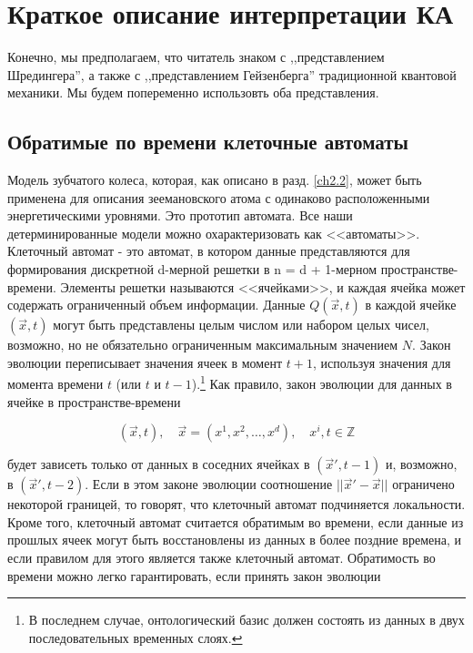 \documentclass[main.tex]{subfiles}
\begin{document}
\section{Краткое описание интерпретации КА}\label{ch5}

Конечно, мы предполагаем, что читатель знаком с ,,представлением Шредингера'', а также с ,,представлением Гейзенберга'' традиционной квантовой механики. Мы будем попеременно использовть оба представления.

\subsection{Обратимые по времени клеточные автоматы }\label{ch5.1}

Модель зубчатого колеса, которая, как описано в разд. \ref{ch2.2}, может быть применена для описания зеемановского атома с одинаково расположенными энергетическими уровнями. Это прототип автомата. Все наши детерминированные модели можно охарактеризовать как <<автоматы>>. Клеточный автомат - это автомат, в котором данные представляются для формирования дискретной d-мерной решетки в n = d + 1-мерном пространстве-времени. Элементы решетки называются <<ячейками>>, и каждая ячейка может содержать ограниченный объем информации. Данные $Q (\vec x, t)$ в каждой ячейке $(\vec x, t)$ могут быть представлены целым числом или набором целых чисел, возможно, но не обязательно ограниченным максимальным значением $N$. Закон эволюции переписывает значения ячеек в момент $t + 1$, используя значения для момента времени $t$ (или $t$ и $t-1$).\footnote{В последнем случае, онтологический базис должен состоять из данных в двух последовательных временных слоях.} Как правило, закон эволюции для данных в ячейке в пространстве-времени

\begin{equation}\label{5.1}
	(\vec{x}, t), \quad \vec{x}=\left(x^{1}, x^{2}, \ldots, x^{d}\right), \quad x^{i}, t \in \mathbb{Z}
\end{equation}
         
будет зависеть только от данных в соседних ячейках в $(\vec x', t-1)$ и, возможно, в $(\vec x', t-2)$. Если в этом законе эволюции соотношение $|| \vec x '- \vec x ||$ ограничено некоторой границей, то говорят, что клеточный автомат подчиняется локальности.
Кроме того, клеточный автомат считается обратимым во времени, если данные из прошлых ячеек могут быть восстановлены из данных в более поздние времена, и если правилом для этого является также клеточный автомат. Обратимость во времени можно легко гарантировать, если принять закон эволюции
\end{document}
